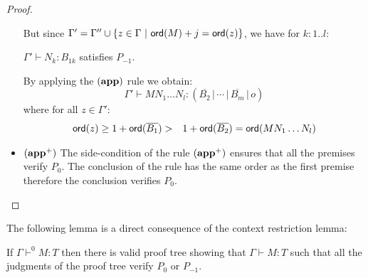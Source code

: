 \begin{proof}
\begin{itemize}
    But since $\Gamma' = \Gamma'' \cup \{ z \in \Gamma \ | \ {\sf ord}(M) + j = {\sf ord}(z)\}$, we have for $k : 1..l$:

    $\Gamma' \vdash N_k : B_{1k}$ satisfies $P_{-1}$.


    By applying  the $\mathbf{(app)}$ rule we obtain:
    $$\Gamma' \vdash M N_1 \ldots N_l : (\overline{B_2} \, | \, \cdots \, | \,
    \overline{B_m} \, | \, o)$$
    where for all $z\in \Gamma'$:
    \begin{eqnarray*}
    {\sf ord}(z) \geq 1 + {\sf ord}(\overline{B_1})
    &>& 1 + {\sf ord}(\overline{B_2}) = {\sf ord}(M N_1 \ldots N_l)
    \end{eqnarray*}

\item $\mathbf{(app^+)}$  The side-condition of the rule $\mathbf{(app^+)}$ ensures that all the premises
 verify $P_0$. The conclusion of the rule has the same order as the first premise
 therefore the conclusion verifies $P_0$.
\end{itemize}
\end{proof}


The following lemma is a direct consequence of the context restriction lemma:
\begin{lem}
\label{lem:prooftree01only}
If $\Gamma \vdash^{0} M : T$ then there is valid proof tree
showing that $\Gamma \vdash M : T$ such that all the judgments
of the proof tree verify $P_0$ or $P_{-1}$.
\end{lem}


